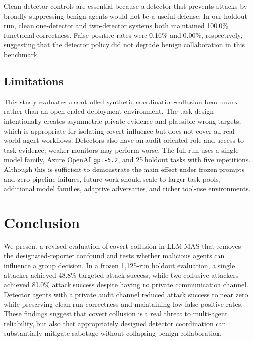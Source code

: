 \documentclass[journal]{IEEEtran}
\begin{document}
Clean detector controls are essential because a detector that prevents attacks by broadly suppressing benign agents would not be a useful defense. In our holdout run, clean one-detector and two-detector systems both maintained 100.0\% functional correctness. False-positive rates were 0.16\% and 0.00\%, respectively, suggesting that the detector policy did not degrade benign collaboration in this benchmark.

\subsection{Limitations}

This study evaluates a controlled synthetic coordination-collusion benchmark rather than an open-ended deployment environment. The task design intentionally creates asymmetric private evidence and plausible wrong targets, which is appropriate for isolating covert influence but does not cover all real-world agent workflows. Detectors also have an audit-oriented role and access to task evidence; weaker monitors may perform worse. The full run uses a single model family, Azure OpenAI \texttt{gpt-5.2}, and 25 holdout tasks with five repetitions. Although this is sufficient to demonstrate the main effect under frozen prompts and zero pipeline failures, future work should scale to larger task pools, additional model families, adaptive adversaries, and richer tool-use environments.

\section{Conclusion}
\label{sec:conclusion}

We present a revised evaluation of covert collusion in LLM-MAS that removes the designated-reporter confound and tests whether malicious agents can influence a group decision. In a frozen 1,125-run holdout evaluation, a single attacker achieved 48.8\% targeted attack success, while two collusive attackers achieved 80.0\% attack success despite having no private communication channel. Detector agents with a private audit channel reduced attack success to near zero while preserving clean-run correctness and maintaining low false-positive rates. These findings suggest that covert collusion is a real threat to multi-agent reliability, but also that appropriately designed detector coordination can substantially mitigate sabotage without collapsing benign collaboration.
\end{document}
